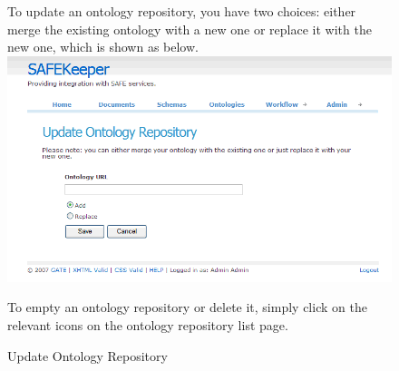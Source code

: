 \begin{figure}
To update an ontology repository, you have two choices: either merge 
the existing ontology with a new one or replace it with the new one, 
which is shown as below.
\newline
\newline
\includegraphics[scale=0.4]{updateontorepo}
\caption{Update Ontology Repository}
\label{fig:updateontorepo}

To empty an ontology repository or delete it, simply click on the 
relevant icons on the ontology repository list page.
\end{figure}

\newpage
\clearpage
